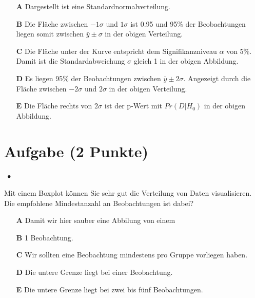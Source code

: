 \documentclass[a4paper, 9pt]{scrartcl}\usepackage[]{graphicx}\usepackage[]{xcolor}
\begin{document}
\begin{enumerate}
\item [\textbf{A} \msquare] Dargestellt ist eine Standardnormalverteilung.
\item [\textbf{B} \msquare] Die Fläche zwischen $-1\sigma$ und $1\sigma$ ist 0.95 und 95\% der Beobachtungen liegen somit zwischen $\bar{y}\pm\sigma$ in der obigen Verteilung.
\item [\textbf{C} \msquare] Die Fläche unter der Kurve entspricht dem Signifikanzniveau $\alpha$ von 5\%. Damit ist die Standardabweichung $\sigma$ gleich 1 in der obigen Abbildung.
\item [\textbf{D} \msquare] Es liegen 95\% der Beobachtungen zwischen $\bar{y}\pm 2 \sigma$. Angezeigt durch die Fläche zwischen $-2\sigma$ und $2\sigma$ in der obigen Verteilung.
\item [\textbf{E} \msquare] Die Fläche rechts von $2\sigma$ ist der p-Wert mit $Pr(D|H_0)$ in der obigen Abbildung.
\end{enumerate} 

\section{Aufgabe \hfill (2 Punkte)}

\ifcollection
\begin{flushright}
\tiny\vspace{-2Ex}
\textbf{\examinhaltstart}
\exammodulestatversuch $\;\bullet$
\exammodulebiostat
\vspace{-1Ex}
\end{flushright}
\fi




Mit einem Boxplot  können Sie sehr gut die Verteilung von Daten visualisieren. Die empfohlene Mindestanzahl an Beobachtungen ist dabei?



\begin{enumerate}
\item [\textbf{A} \msquare] Damit wir hier sauber eine Abbilung von einem 
\item [\textbf{B} \msquare] 1 Beobachtung.
\item [\textbf{C} \msquare] Wir sollten eine Beobachtung mindestens pro Gruppe vorliegen haben.
\item [\textbf{D} \msquare] Die untere Grenze liegt bei einer Beobachtung.
\item [\textbf{E} \msquare] Die untere Grenze liegt bei zwei bis fünf Beobachtungen.
\end{enumerate}
\end{document}
